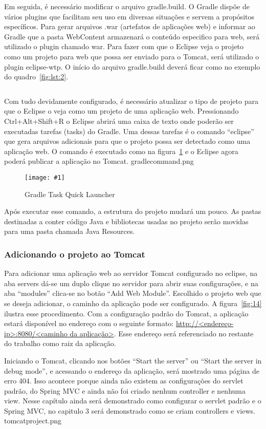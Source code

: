 \documentclass[a4paper,12pt]{article}
\newenvironment{simple}%
{\noindent}%
{\par\noindent}
\newcommand{\figura}[3] {
	\begin{figure}[H]
		\centering
		\texttt{[image: \#1]}
		\caption{#2}
		\label{#3}
	\end{figure}
	\FloatBarrier
}
\newcommand{\groovycode}[3] {
	\begin{simple}
	\inputminted[fontsize=\footnotesize]{groovy}{#1}
	\captionof{listing}{#2}
	\label{#3}
	\end{simple}
	\FloatBarrier
}
\begin{document}
Em seguida, é necessário modificar o arquivo gradle.build. O Gradle dispõe de vários plugins que facilitam seu uso em diversas situações e servem a propósitos específicos. Para gerar arquivos .war (artefatos de aplicações web) e informar ao Gradle que a pasta WebContent armazenará o conteúdo especifico para web, será utilizado o plugin chamado war. Para fazer com que o Eclipse veja o projeto como um projeto para web que possa ser enviado para o Tomcat, será utilizado o plugin eclipse-wtp. O início do arquivo gradle.build deverá ficar como no exemplo do quadro~\ref{fig:lst:2}.

\groovycode{code/newgradle.txt}{Arquivo gradle.build com novos plugins}{lst:2}

Com tudo devidamente configurado, é necessário atualizar o tipo de projeto para que o Eclipse o veja como um projeto de uma aplicação web. Pressionando Ctrl+Alt+Shift+R o Eclipse abrirá uma caixa de texto onde poderão ser executadas tarefas (tasks) do Gradle. Uma dessas tarefas é o comando “eclipse” que gera arquivos adicionais para que o projeto possa ser detectado como uma aplicação web. O comando é executado como na figura~\ref{fig:13} e o Eclipse agora poderá publicar a aplicação no Tomcat. gradlecommand.png

\figura{gradlecommand.png}{Gradle Task Quick Launcher}{fig:13}

Após executar esse comando, a estrutura do projeto mudará um pouco. As pastas destinadas a conter código Java e bibliotecas usadas no projeto serão movidas para uma pasta chamada Java Resources.

\subsubsection{Adicionando o projeto ao Tomcat}

Para adicionar uma aplicação web ao servidor Tomcat configurado no eclipse, na aba servers dá-se um duplo clique no servidor para abrir suas configurações, e na aba “modules” clica-se no botão “Add Web Module”. Escolhido o projeto web que se deseja adicionar, o caminho da aplicação pode ser configurado. A figura~\ref{fig:14} ilustra esse procedimento. Com a configuração padrão do Tomcat, a aplicação estará disponível no endereço com o seguinte formato: \url{http://<endereço-ip>:8080/<caminho da aplicação>}. Esse endereço será referenciado no restante do trabalho como raiz da aplicação.

Iniciando o Tomcat, clicando nos botões “Start the server” ou “Start the server in debug mode”, e acessando o endereço da aplicação, será mostrado uma página de erro 404. Isso acontece porque ainda não existem as configurações do servlet padrão, do Spring MVC e ainda não foi criado nenhum controller e nenhuma view. Nesse capítulo ainda será demonstrado como configurar o servlet padrão e o Spring MVC, no capitulo 3 será demonstrado como se criam controllers e views. tomcatproject.png
\end{document}
